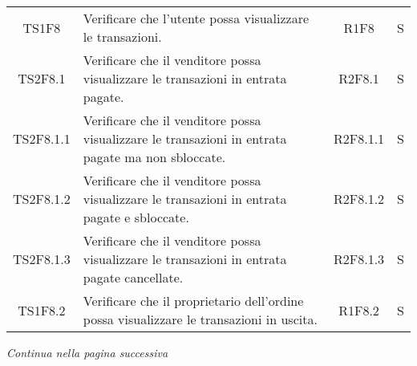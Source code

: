 \begin{table}[H]
\begin{tabular}{c|p{8cm}|c|c}
    TS1F8     & Verificare che l'utente possa visualizzare le transazioni.                                                                             & R1F8     & S \\
    TS2F8.1   & Verificare che il venditore possa visualizzare le transazioni in entrata pagate.                                                       & R2F8.1   & S \\
    TS2F8.1.1 & Verificare che il venditore possa visualizzare le transazioni in entrata pagate ma non sbloccate.                                      & R2F8.1.1 & S \\
    TS2F8.1.2 & Verificare che il venditore possa visualizzare le transazioni in entrata pagate e sbloccate.                                           & R2F8.1.2 & S \\
    TS2F8.1.3 & Verificare che il venditore possa visualizzare le transazioni in entrata pagate cancellate.                                            & R2F8.1.3 & S \\
    TS1F8.2   & Verificare che il proprietario dell'ordine possa visualizzare le transazioni in uscita.                                                & R1F8.2   & S \\
  \end{tabular}
\end{table}
\begin{center}
  \textit{\small Continua nella pagina successiva}
\end{center}

